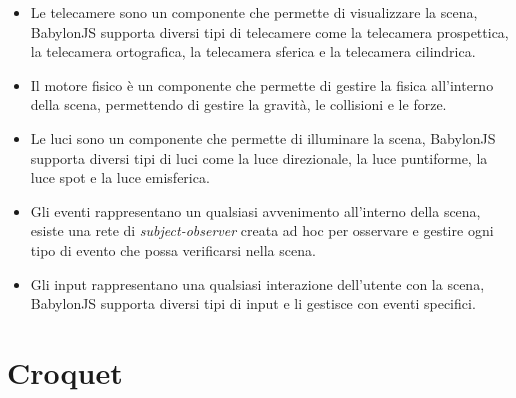 \begin{itemize}
\begin{itemize}
        \item Le telecamere sono un componente che permette di visualizzare la scena, BabylonJS supporta diversi tipi di telecamere come la telecamera prospettica, la telecamera ortografica,
        la telecamera sferica e la telecamera cilindrica.
        \item Il motore fisico è un componente che permette di gestire la fisica all'interno della scena, permettendo di gestire la gravità, le collisioni e le forze.
        \item Le luci sono un componente che permette di illuminare la scena, BabylonJS supporta diversi tipi di luci come la luce direzionale, la luce puntiforme, la luce spot e la luce
        emisferica.
        \item Gli eventi rappresentano un qualsiasi avvenimento all'interno della scena, esiste una rete di \textit{subject-observer} creata ad hoc per osservare e gestire ogni tipo
        di evento che possa verificarsi nella scena.
        \item Gli input rappresentano una qualsiasi interazione dell'utente con la scena, BabylonJS supporta diversi tipi di input e li gestisce con eventi specifici.
    \end{itemize}
\end{itemize}

\section{Croquet}\label{sec:Croquet}